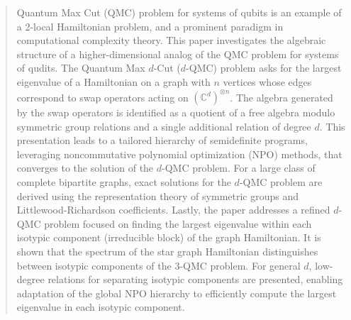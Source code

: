 \documentclass[12pt,dvipsnames,accepted=2016-08-18,a4paper,onecolumn]{quantumarticle}
\numberwithin{equation}{section}
\newcommand{\CC}{\mathbb C}
\theoremstyle{definition}
\begin{document}
\begin{abstract}
Quantum Max Cut (QMC) problem for systems of qubits is an example of a 2-local Hamiltonian problem, and a prominent paradigm in computational complexity theory. This paper investigates the algebraic structure of a higher-dimensional analog of the QMC problem for systems of qudits. The Quantum Max $d$-Cut ($d$-QMC) problem asks for the largest eigenvalue of a Hamiltonian on a graph with $n$ vertices whose edges correspond to swap operators acting on $(\CC^d)^{\otimes n}$.
The algebra generated by the swap operators is identified as a quotient of a free algebra modulo symmetric group relations and a single additional relation of degree $d$. This presentation leads to a tailored hierarchy of semidefinite programs,
leveraging noncommutative polynomial optimization (NPO) methods,
that converges to the solution of the $d$-QMC problem. 
For a large class of complete bipartite graphs, exact solutions for the $d$-QMC problem are derived using the representation theory of symmetric groups and Littlewood-Richardson coefficients. 
Lastly, the paper addresses a refined $d$-QMC problem focused on finding the largest eigenvalue within each isotypic component (irreducible block) of the graph Hamiltonian. 
It is shown that the spectrum of the star graph Hamiltonian distinguishes between isotypic components of the $3$-QMC problem. 
For general $d$, low-degree relations for separating isotypic components are presented, enabling adaptation of the global NPO hierarchy to efficiently compute the largest eigenvalue in each isotypic component.
\end{abstract}

\end{document}
